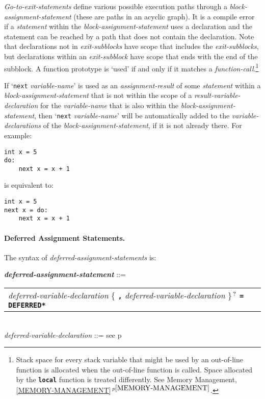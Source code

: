 \documentclass[12pt]{article}
\newcommand{\subsubsubsection}[1]{\paragraph[#1]{#1.}}
\newcommand{\TT}[1]{{\tt \bfseries #1}}
\newcommand{\QMARK}{{$^{\,\mbox{\footnotesize ?}}$}}
\newcommand{\ttkey}[1]{{\tt \bfseries #1}}
\newcommand{\emkey}[1]{{\em \bfseries #1}}
\newcommand{\itemref}[1]{\ref{#1}$\,^{p\pageref{#1}}$}
\newcommand{\pagref}[1]{p\pageref{#1}}
\newenvironment{indpar}[1][0.3in]%
	{\begin{list}{}%
		     {\setlength{\itemsep}{0in}%
		      \setlength{\topsep}{0in}%
		      \setlength{\parsep}{1ex}%
		      \setlength{\labelwidth}{#1}%
		      \setlength{\leftmargin}{#1}%
		      \addtolength{\leftmargin}{\labelsep}}%
	 \item}%
	{\end{list}}
\begin{document}
{\em Go-to-exit-statements} define various possible execution
paths through a {\em block-assignment-statement}
(these are paths in an acyclic graph).
It is a compile error if a {\em statement}
within the {\em block-assignment-statement}
uses a declaration and the statement can be reached by a path that
does not contain the declaration.
Note that declarations not in {\em exit-subblocks} have scope
that includes the {\em exit-subblocks}, but declarations
within an {\em exit-subblock} have scope that ends with the end of
the subblock.  A function prototype is `used' if and only if it
matches a {\em function-call}.\footnote{Stack space for every
stack variable that might be used by an out-of-line function is
allocated when the out-of-line function is called.  Space allocated
by the \TT{local} function is treated differently.  See
Memory Management, \itemref{MEMORY-MANAGEMENT}.}

If\label{BLOCK-NEXT-PROMOTION} `{\tt next} {\em variable-name}' is used as an
{\em assignment-result} of some {\em statement} within a
{\em block-assignment-statement} that is not within the scope of
a {\em result-variable-declaration} for the {\em variable-name}
that is also within the {\em block-assignment-statement},
then `{\tt next} {\em variable-name}' will be automatically added
to the {\em variable-declarations} of the {\em block-assignment-statement},
if it is not already there.  For example:
\begin{indpar}\begin{verbatim}
int x = 5
do:
    next x = x + 1
\end{verbatim}\end{indpar}
is equivalent to:
\begin{indpar}\begin{verbatim}
int x = 5
next x = do:
    next x = x + 1
\end{verbatim}\end{indpar}

\subsubsubsection{Deferred Assignment Statements}
\label{DEFERRED-ASSIGNMENT-STATEMENTS}

The syntax of {\em defer\-red-assignment-state\-ments} is:

\begin{indpar}
\emkey{deferred-assignment-statement} ::= \\
\hspace*{0.3in}
    \begin{tabular}[t]{@{}l}
        {\em deferred-variable-declaration}
                \{ \TT{,} {\em deferred-variable-declaration} \}\QMARK{}
		     \TT{=} \ttkey{*DEFERRED*} \\
    \end{tabular}
\\[0.5ex]
{\em deferred-variable-declaration} ::=
    see \pagref{DEFERRED-VARIABLE-DECLARATION}
\end{indpar}
\end{document}
